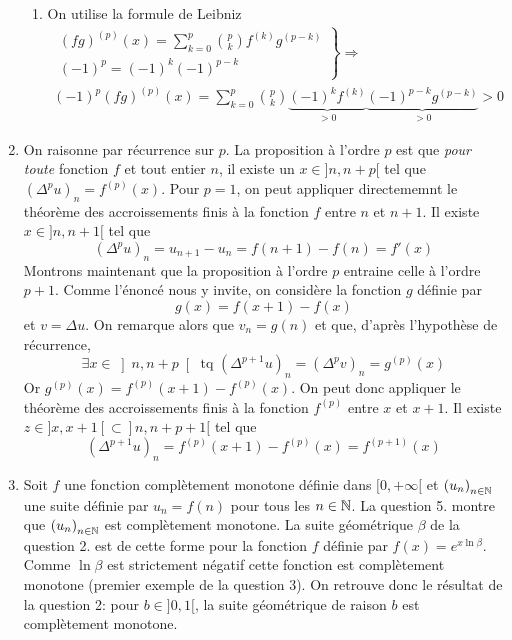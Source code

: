 \begin{enumerate}
\begin{enumerate}
 \item On utilise la formule de Leibniz
\begin{multline*}
\left. 
\begin{aligned}
 (fg)^{(p)}(x) = 
\sum_{k=0}^p\binom{p}{k}f^{(k)}g^{(p-k)}\\
 (-1)^p = (-1)^k(-1)^{p-k}
\end{aligned}
\right\rbrace 
\Rightarrow \\
 (-1)^p(fg)^{(p)}(x) = \sum_{k=0}^p\binom{p}{k}
\underset{>0}{\underbrace{(-1)^kf^{(k)}}}
\underset{>0}{\underbrace{(-1)^{p-k}g^{(p-k)}}} >0
\end{multline*}
\end{enumerate}

 \item On raisonne par récurrence sur $p$. La proposition à l'ordre $p$ est que \emph{pour toute} fonction $f$ et tout entier $n$, il existe un $x\in ]n,n+p[$ tel que $(\Delta^p u)_n = f^{(p)}(x)$.\newline
 Pour $p=1$, on peut appliquer directememnt le théorème des accroissements finis à la fonction $f$ entre $n$ et $n+1$. Il existe $x\in ]n,n+1[$ tel que
\begin{displaymath}
 (\Delta^p u)_n = u_{n+1}-u_n=f(n+1)-f(n) = f'(x)
\end{displaymath}
Montrons maintenant que la proposition à l'ordre $p$ entraine celle à l'ordre $p+1$.\newline
Comme l'énoncé nous y invite, on considère la fonction $g$ définie par 
\begin{displaymath}
 g(x)=f(x+1)-f(x) 
\end{displaymath}
et $v=\Delta u$. On remarque alors que $v_n=g(n)$ et que, d'après l'hypothèse de récurrence,
\begin{displaymath}
 \exists x \in \left]n,n+p \right[ \text{ tq } (\Delta^{p+1} u)_n = (\Delta^p v)_n = g^{(p)}(x)  
\end{displaymath}
Or $g^{(p)}(x)=f^{(p)}(x+1)-f^{(p)}(x)$. On peut donc appliquer le théorème des accroissements finis à la fonction $f^{(p)}$ entre $x$ et $x+1$. Il existe $z\in ]x,x+1[\subset ]n,n+p+1[$ tel que
\begin{displaymath}
  (\Delta^{p+1} u)_n = f^{(p)}(x+1)-f^{(p)}(x) = f^{(p+1)}(x)
\end{displaymath}


 \item Soit $f$ une fonction complètement monotone définie dans $[0,+\infty[$ et $\left( u_n\right) _{n\in \mathbb{N}}$ une suite définie par $u_n=f(n)$ pour tous les $n\in \mathbb{N}$. La question 5. montre que $\left( u_n\right) _{n\in \mathbb{N}}$ est complètement monotone.\newline
La suite géométrique $\beta$ de la question 2. est de cette forme pour la fonction $f$ définie par $f(x)=e^{x\ln \beta}$. Comme $\ln \beta$ est strictement négatif cette fonction est complètement monotone (premier exemple de la question 3).\newline
On retrouve donc le résultat de la question 2: pour $b\in ]0,1[$, la suite géométrique de raison $b$ est complètement monotone.
\end{enumerate}
